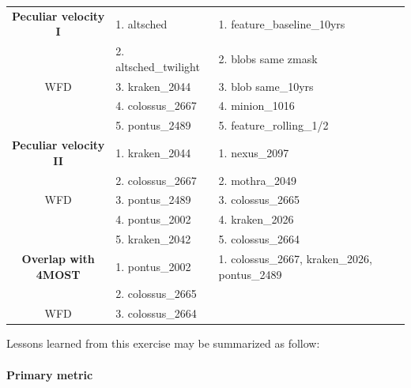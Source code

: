 \documentclass[a4paper,10pt]{article}
\begin{document}
\begin{table}[!htbp]
\begin{center}
\begin{tabular}{c|l|l}
{\bf Peculiar velocity I}      & 1. altsched                              &  1. feature\_baseline\_10yrs \\
                               & 2. altsched\_twilight                     &  2. blobs same zmask\\
      WFD                      & 3. kraken\_2044                           &  3. blob same\_10yrs \\
                               & 4. colossus\_2667                        &  4. minion\_1016\\
                               & 5. pontus\_2489                          &  5. feature\_rolling\_1/2\\
      \hline
{\bf Peculiar velocity II}     & 1. kraken\_2044                          &  1. nexus\_2097\\
                               & 2. colossus\_2667                        &  2. mothra\_2049 \\
      WFD                      & 3. pontus\_2489                          &  3. colossus\_2665 \\
                               & 4. pontus\_2002                          &  4. kraken\_2026 \\
                               & 5. kraken\_2042                           &  5. colossus\_2664 \\
      \hline

 {\bf Overlap with 4MOST}      & 1. pontus\_2002                          &  1. colossus\_2667, kraken\_2026, pontus\_2489\\
                               & 2. colossus\_2665                        &  \\
   WFD                         & 3. colossus\_2664                        &   \\
     \hline
\end{tabular}
\end{center}
\end{table}

\noindent Lessons learned from this exercise may be summarized as follow:

\paragraph{Primary metric} 
\end{document}

